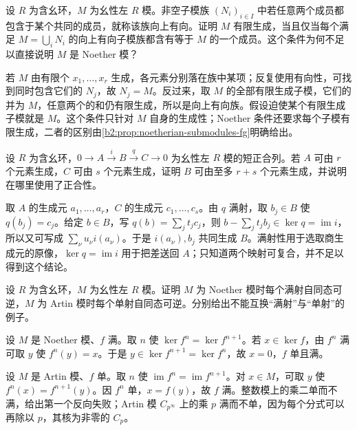 \begin{exercise}\label{b2:ex:12-directed-cover}
	设 \(R\) 为含幺环，\(M\) 为幺性左 \(R\) 模。非空子模族 \((N_i)_{i\in I}\) 中若任意两个成员都包含于某个共同的成员，就称该族向上有向。证明 \(M\) 有限生成，当且仅当每个满足 \(M=\bigcup_iN_i\) 的向上有向子模族都含有等于 \(M\) 的一个成员。这个条件为何不足以直接说明 \(M\) 是 Noether 模？
\end{exercise}
\begin{solution}
	若 \(M\) 由有限个 \(x_1,\ldots,x_r\) 生成，各元素分别落在族中某项；反复使用有向性，可找到同时包含它们的 \(N_j\)，故 \(N_j=M\)。反过来，取 \(M\) 的全部有限生成子模，它们的并为 \(M\)，任意两个的和仍有限生成，所以是向上有向族。假设迫使某个有限生成子模就是 \(M\)。这个条件只针对 \(M\) 自身的生成性；Noether 条件还要求每个子模有限生成，二者的区别由\cref{b2:prop:noetherian-submodules-fg}明确给出。
\end{solution}

\begin{exercise}\label{b2:ex:12-generator-extension}
	设 \(R\) 为含幺环，\(0\rightarrow A\xrightarrow{i}B\xrightarrow{q}C\rightarrow0\) 为幺性左 \(R\) 模的短正合列。若 \(A\) 可由 \(r\) 个元素生成，\(C\) 可由 \(s\) 个元素生成，证明 \(B\) 可由至多 \(r+s\) 个元素生成，并说明在哪里使用了正合性。
\end{exercise}
\begin{solution}
	取 \(A\) 的生成元 \(a_1,\ldots,a_r\)，\(C\) 的生成元 \(c_1,\ldots,c_s\)。由 \(q\) 满射，取 \(b_j\in B\) 使 \(q(b_j)=c_j\)。给定 \(b\in B\)，写 \(q(b)=\sum_j t_jc_j\)，则 \(b-\sum_jt_jb_j\in\ker q=\operatorname{im}i\)，所以又可写成 \(\sum_\nu u_\nu i(a_\nu)\)。于是 \(i(a_\nu),b_j\) 共同生成 \(B\)。满射性用于选取商生成元的原像，\(\ker q=\operatorname{im}i\) 用于把差送回 \(A\)；只知道两个映射可复合，并不足以得到这个结论。
\end{solution}

\begin{exercise}\label{b2:ex:12-one-sided-endomorphism}
	设 \(R\) 为含幺环，\(M\) 为幺性左 \(R\) 模。证明 \(M\) 为 Noether 模时每个满射自同态可逆，\(M\) 为 Artin 模时每个单射自同态可逆。分别给出不能互换“满射”与“单射”的例子。
\end{exercise}
\begin{solution}
	设 \(M\) 是 Noether 模、\(f\) 满。取 \(n\) 使 \(\ker f^n=\ker f^{n+1}\)。若 \(x\in\ker f\)，由 \(f^n\) 满可取 \(y\) 使 \(f^n(y)=x\)。于是 \(y\in\ker f^{n+1}=\ker f^n\)，故 \(x=0\)，\(f\) 单且满。

	设 \(M\) 是 Artin 模、\(f\) 单。取 \(n\) 使 \(\operatorname{im}f^n=\operatorname{im}f^{n+1}\)。对 \(x\in M\)，可取 \(y\) 使 \(f^n(x)=f^{n+1}(y)\)。因 \(f^n\) 单，\(x=f(y)\)，故 \(f\) 满。整数模上的乘二单而不满，给出第一个反向失败；Artin 模 \(C_{p^\infty}\) 上的乘 \(p\) 满而不单，因为每个分式可以再除以 \(p\)，其核为非零的 \(C_p\)。
\end{solution}

